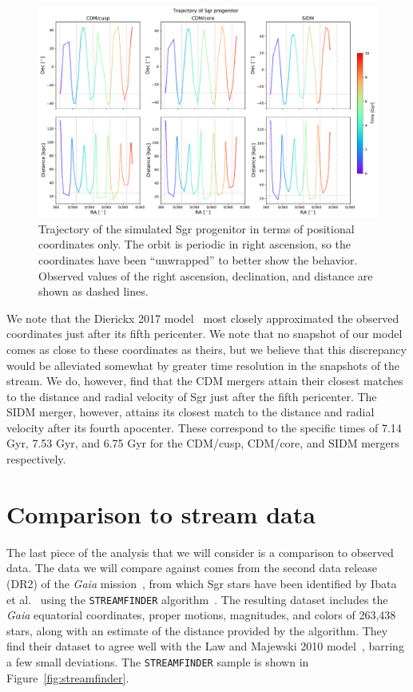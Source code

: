 \begin{figure}
    \centering 
    \includegraphics[width=0.9\linewidth]{figs/equatorial_progenitor_coords_unwrapped.pdf}
    \caption{%
        Trajectory of the simulated Sgr progenitor in terms of positional
        coordinates only. The orbit is periodic in right ascension, so the
        coordinates have been ``unwrapped'' to better show the behavior.
        Observed values of the right ascension, declination, and distance are
        shown as dashed lines.
    }
    \label{fig:eq_prog_unwrapped}
\end{figure}

We note that the Dierickx 2017 model~\cite{dierickx_predicted_2017} most closely
approximated the observed coordinates just after its fifth pericenter. We note
that no snapshot of our model comes as close to these coordinates as theirs, but
we believe that this discrepancy would be alleviated somewhat by greater time
resolution in the snapshots of the stream. We do, however, find that the CDM
mergers attain their closest matches to the distance and radial velocity of Sgr
just after the fifth pericenter. The SIDM merger, however, attains its closest
match to the distance and radial velocity after its fourth apocenter. These
correspond to the specific times of 7.14 Gyr, 7.53 Gyr, and 6.75 Gyr for the
CDM/cusp, CDM/core, and SIDM mergers respectively.


\hypertarget{comparison-to-stream-data}{%
\section{Comparison to stream data}\label{comparison-to-stream-data}}

The last piece of the analysis that we will consider is a comparison to observed
data.  The data we will compare against comes from the second data release
(DR2) of the \textit{Gaia}
mission~\cite{lindegren_gaia_2018,gaia_collaboration_gaia_2018}, from which Sgr
stars have been identified by Ibata et al.~\cite{ibata_panoramic_2020} using the
\verb|STREAMFINDER|
algorithm~\cite{malhan_streamfinder_2018,malhan_ghostly_2018}. The resulting
dataset includes the \textit{Gaia} equatorial coordinates, proper motions,
magnitudes, and colors of 263,438 stars, along with an estimate of the distance
provided by the algorithm. They find their dataset to agree well with the Law
and Majewski 2010 model~\cite{law_sagittarius_2010}, barring a few small
deviations. The \verb|STREAMFINDER| sample is shown in Figure~\ref{fig:streamfinder}.

